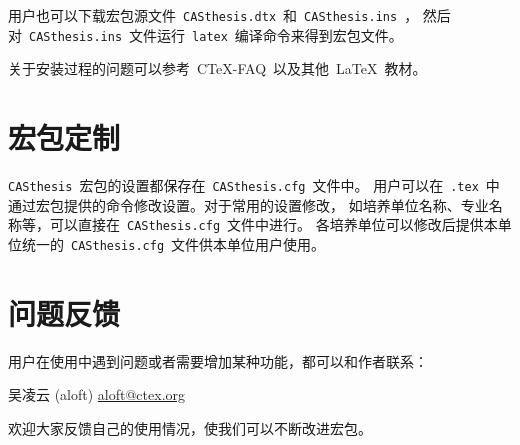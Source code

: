 用户也可以下载宏包源文件~\texttt{CASthesis.dtx}~和~\texttt{CASthesis.ins}~，
然后对~\texttt{CASthesis.ins}~文件运行~\texttt{latex}~编译命令来得到宏包文件。

关于安装过程的问题可以参考~C\TeX{}-FAQ~以及其他~\LaTeX{}~教材。

\section{宏包定制}

\texttt{CASthesis}~宏包的设置都保存在~\texttt{CASthesis.cfg}~文件中。
用户可以在~\texttt{.tex}~中通过宏包提供的命令修改设置。对于常用的设置修改，
如培养单位名称、专业名称等，可以直接在~\texttt{CASthesis.cfg}~文件中进行。
各培养单位可以修改后提供本单位统一的~\texttt{CASthesis.cfg}~文件供本单位用户使用。

\section{问题反馈}

用户在使用中遇到问题或者需要增加某种功能，都可以和作者联系：

\begin{center}
吴凌云 (aloft) \quad \href{mailto:aloft@ctex.org}{aloft@ctex.org}
\end{center}

欢迎大家反馈自己的使用情况，使我们可以不断改进宏包。

